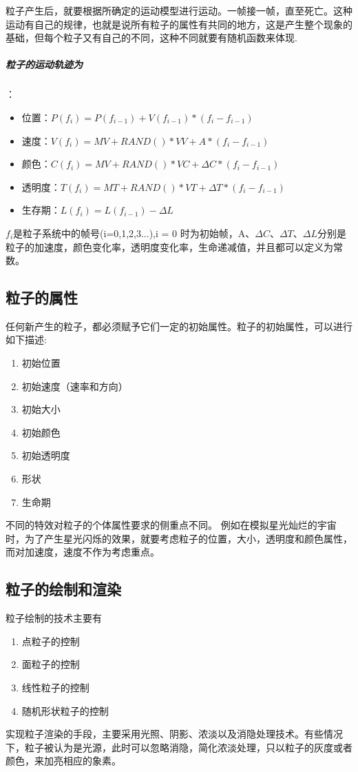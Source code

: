 \documentclass[UTF8,a4paper,14pt]{ctexart}
\begin{document}
			粒子产生后，就要根据所确定的运动模型进行运动。一帧接一帧，直至死亡。这种运动有自己的规律，也就是说所有粒子的属性有共同的地方，这是产生整个现象的基础，但每个粒子又有自己的不同，这种不同就要有随机函数来体现.
			\subparagraph{粒子的运动轨迹为}：
			\begin{itemize}
				\item 位置：$P(f_i) = P(f_{i-1}) + V(f_{i-1})*(f_i-f_{i-1})$
					
				\item 速度：$V(f_i) = MV + RAND()*VV + A*(f_i - f_{i-1})$
				
				\item 颜色：$C(f_i) = MV + RAND()*VC + \Delta C*(f_i - f_{i-1})$
				
				\item 透明度：$T(f_i) = MT + RAND()*VT + \Delta T*(f_i - f_{i-1})$
				
				\item 生存期：$L(f_i) = L(f_{i-1}) - \Delta L$
			\end{itemize}
			$f_i$是粒子系统中的帧号(i=0,1,2,3...),i = 0 时为初始帧，A、$\Delta C、 \Delta T 、\Delta L$分别是粒子的加速度，颜色变化率，透明度变化率，生命递减值，并且都可以定义为常数。
	\subsection{粒子的属性}
		任何新产生的粒子，都必须赋予它们一定的初始属性。粒子的初始属性，可以进行如下描述:
			\begin{enumerate}[fullwidth,itemindent = 2em]
				\item 初始位置
				\item 初始速度（速率和方向） 
				\item 初始大小
				\item 初始颜色
				\item 初始透明度
				\item 形状
				\item 生命期
			\end{enumerate}
		不同的特效对粒子的个体属性要求的侧重点不同。 例如在模拟星光灿烂的宇宙时，为了产生星光闪烁的效果，就要考虑粒子的位置，大小，透明度和颜色属性，而对加速度，速度不作为考虑重点。

		
	\subsection{粒子的绘制和渲染}
		粒子绘制的技术主要有
		\begin{enumerate}[fullwidth,itemindent=2em]
			\item 点粒子的控制
			\item 面粒子的控制
			\item 线性粒子的控制
			\item 随机形状粒子的控制
		\end{enumerate}
		实现粒子渲染的手段，主要采用光照、阴影、浓淡以及消隐处理技术。有些情况下，粒子被认为是光源，此时可以忽略消隐，简化浓淡处理，只以粒子的灰度或者颜色，来加亮相应的象素。
		
\end{document}
